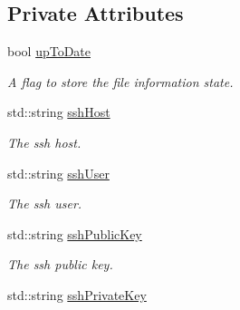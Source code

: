 \subsection*{Private Attributes}
\begin{DoxyCompactItemize}
\item 
\hypertarget{classSSHFile_a2b10c98c5d8d483179ec38fc0eb26978}{
bool \hyperlink{classSSHFile_a2b10c98c5d8d483179ec38fc0eb26978}{upToDate}}
\label{classSSHFile_a2b10c98c5d8d483179ec38fc0eb26978}

\begin{DoxyCompactList}\small\item\em A flag to store the file information state. \item\end{DoxyCompactList}\item 
\hypertarget{classSSHFile_a5a4a3d20457a33f57824b7defe7c2df5}{
std::string \hyperlink{classSSHFile_a5a4a3d20457a33f57824b7defe7c2df5}{sshHost}}
\label{classSSHFile_a5a4a3d20457a33f57824b7defe7c2df5}

\begin{DoxyCompactList}\small\item\em The ssh host. \item\end{DoxyCompactList}\item 
\hypertarget{classSSHFile_a4c6b4d096a6a9fd2043bcd24990f1ba1}{
std::string \hyperlink{classSSHFile_a4c6b4d096a6a9fd2043bcd24990f1ba1}{sshUser}}
\label{classSSHFile_a4c6b4d096a6a9fd2043bcd24990f1ba1}

\begin{DoxyCompactList}\small\item\em The ssh user. \item\end{DoxyCompactList}\item 
\hypertarget{classSSHFile_af11b98c5b07958117814b032f1ebbcd1}{
std::string \hyperlink{classSSHFile_af11b98c5b07958117814b032f1ebbcd1}{sshPublicKey}}
\label{classSSHFile_af11b98c5b07958117814b032f1ebbcd1}

\begin{DoxyCompactList}\small\item\em The ssh public key. \item\end{DoxyCompactList}\item 
\hypertarget{classSSHFile_a31b70dd7571b49a4be99c40e1150a8fc}{
std::string \hyperlink{classSSHFile_a31b70dd7571b49a4be99c40e1150a8fc}{sshPrivateKey}}
\label{classSSHFile_a31b70dd7571b49a4be99c40e1150a8fc}


\end{DoxyCompactItemize}

